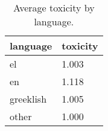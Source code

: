 \begin{table}
\caption{Average toxicity by language.}
\label{tab::toxic_lang}
\begin{tabular}{|p{3.5cm}|p{1cm}|}
\toprule
language & toxicity \\
\midrule
el & 1.003 \\
en & 1.118 \\
greeklish & 1.005 \\
other & 1.000 \\
\bottomrule
\end{tabular}
\end{table}
